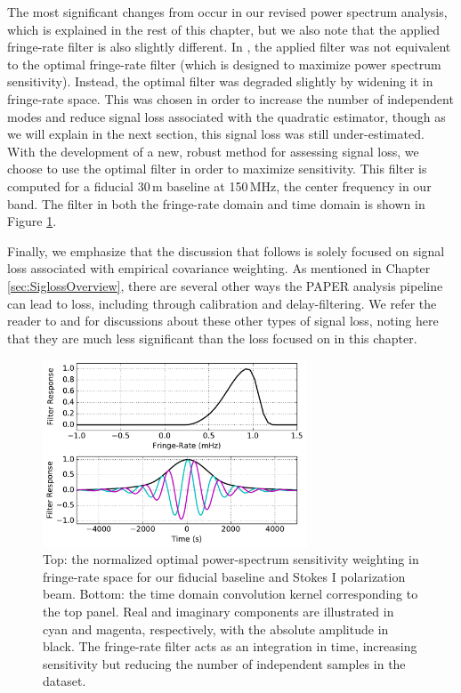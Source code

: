 The most significant changes from  occur in our revised power spectrum analysis, which is explained in the rest of this chapter, but we also note that the applied fringe-rate filter is also slightly different. In , the 
applied filter was not equivalent to the optimal fringe-rate filter (which is designed to maximize power spectrum sensitivity). Instead, the optimal filter was degraded slightly by widening it in fringe-rate space. This was chosen in order to increase the number of independent 
modes and reduce signal loss associated with the quadratic estimator, though as we will explain in the next section, this signal loss was still under-estimated. With the development of a new, 
robust method for assessing signal loss, we choose to use the optimal filter in order to maximize sensitivity. This filter is 
computed for a fiducial 30\,m baseline at 150\,MHz, the center frequency in our band. The filter in both the fringe-rate 
domain and time domain is shown in Figure \ref{fig:frp}.

Finally, we emphasize that the discussion that follows is solely focused on signal loss associated with empirical covariance weighting. As mentioned in Chapter \ref{sec:SiglossOverview}, there are several other ways the PAPER analysis pipeline can lead to loss, including through calibration and delay-filtering. We refer the reader to \citet{parsons_et_al2010} and  for discussions about these other types of signal loss, noting here that they are much less significant than the loss focused on in this chapter.

\begin{figure}
    \centering
    \includegraphics[width=0.7\textwidth]{plots/frp.pdf}
    \caption{Top: the normalized optimal power-spectrum sensitivity weighting in fringe-rate space for our fiducial baseline and 
Stokes I polarization beam. Bottom: the time domain convolution kernel corresponding to the top panel. Real and imaginary 
components are illustrated in cyan and magenta, respectively, with the absolute amplitude in black. The fringe-rate filter acts as 
an integration in time, increasing sensitivity but reducing the number of independent samples in the dataset.}
    \label{fig:frp}
\end{figure}

